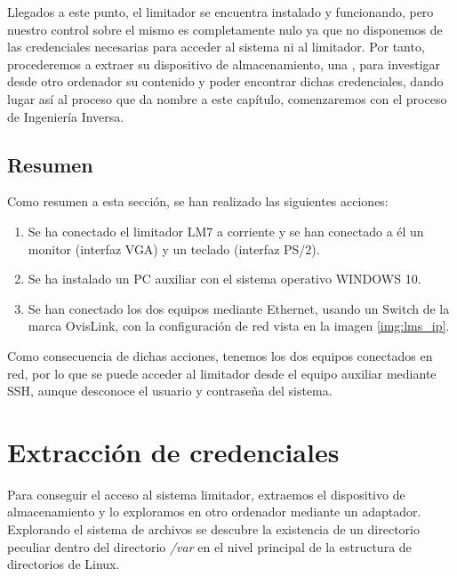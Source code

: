 Llegados a este punto, el limitador se encuentra instalado y funcionando, pero nuestro control sobre el mismo es completamente nulo ya que no disponemos de las credenciales necesarias para acceder al sistema ni al limitador. Por tanto, procederemos a extraer su dispositivo de almacenamiento, una , para investigar desde otro ordenador su contenido y poder encontrar dichas credenciales, dando lugar así al proceso que da nombre a este capítulo, comenzaremos con el proceso de Ingeniería Inversa.

\subsection{Resumen} \label{cap1:sec1:resumen}

Como resumen a esta sección, se han realizado las siguientes acciones:

\begin{enumerate}
    \item Se ha conectado el limitador \acrshort{LM7} a corriente y se han conectado a él un monitor (interfaz VGA) y un teclado (interfaz PS/2).
    \item Se ha instalado un \acrshort{PC} auxiliar con el sistema operativo \gls{WINDOWS} 10.
    \item Se han conectado los dos equipos mediante Ethernet, usando un Switch de la marca OvisLink, con la configuración de red vista en la imagen \ref{img:lms_ip}.
\end{enumerate}

Como consecuencia de dichas acciones, tenemos los dos equipos conectados en red, por lo que se puede acceder al limitador desde el equipo auxiliar mediante \acrshort{SSH}, aunque desconoce el usuario y contraseña del sistema.

\section{Extracción de credenciales}

Para conseguir el acceso al sistema limitador, extraemos el dispositivo de almacenamiento y lo exploramos en otro ordenador mediante un adaptador. Explorando el sistema de archivos se descubre la existencia de un directorio peculiar dentro del directorio \textit{/var} en el nivel principal de la estructura de directorios de Linux.

